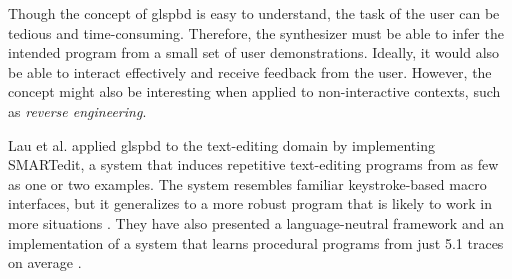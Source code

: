 Though the concept of gls{pbd} is easy to understand, the task of the user can
be tedious and time-consuming. Therefore, the synthesizer must be able to infer
the intended program from a small set of user demonstrations. Ideally, it would
also be able to interact effectively and receive feedback from the user.
However, the concept might also be interesting when applied to non-interactive
contexts, such as \textit{reverse engineering}.

Lau et al. applied gls{pbd} to the text-editing domain by implementing
SMARTedit, a system that induces repetitive text-editing programs from as few as
one or two examples. The system resembles familiar keystroke-based macro
interfaces, but it generalizes to a more robust program that is likely to work
in more situations \cite{Lau2003}. They have also presented a language-neutral
framework and an implementation of a system that learns procedural programs from
just 5.1 traces on average \cite{Lau:traces:2003}.
